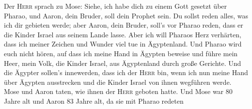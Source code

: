 Der \textsc{Herr} sprach zu Mose: Siehe, ich habe dich zu
einem Gott gesetzt über Pharao, und Aaron, dein Bruder, soll dein
Prophet sein.  Du sollst reden alles, was ich dir gebieten
werde; aber Aaron, dein Bruder, soll's vor Pharao reden, dass er die
Kinder Israel aus seinem Lande lasse.  Aber ich will
Pharaos Herz verhärten, dass ich meiner Zeichen und Wunder viel tue in
Ägyptenland.  Und Pharao wird euch nicht hören, auf dass
ich meine Hand in Ägypten beweise und führe mein Heer, mein Volk, die
Kinder Israel, aus Ägyptenland durch große Gerichte.  Und
die Ägypter sollen's innewerden, dass ich der \textsc{Herr} bin, wenn
ich nun meine Hand über Ägypten ausstrecken und die Kinder Israel von
ihnen wegführen werde.  Mose und Aaron taten, wie ihnen
der \textsc{Herr} geboten hatte.  Und Mose war 80 Jahre
alt und Aaron 83 Jahre alt, da sie mit Pharao redeten

